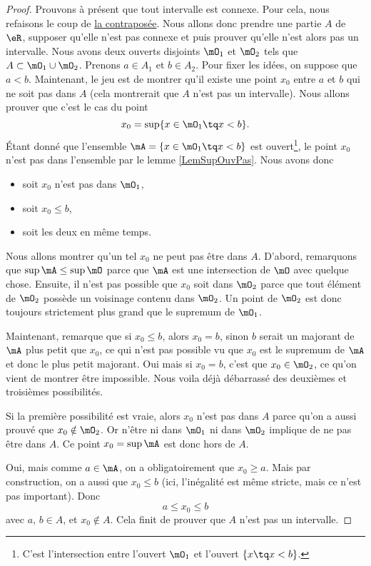 \begin{proof}
    Prouvons à présent que tout intervalle est connexe. Pour cela, nous refaisons le coup de \href{http://fr.wikipedia.org/wiki/Contraposée}{la contraposée}. Nous allons donc prendre une partie $A$ de $\eR$, supposer qu'elle n'est pas connexe et puis prouver qu'elle n'est alors pas un intervalle. Nous avons deux ouverts disjoints $\mO_1$ et $\mO_2$ tels que $A\subset \mO_1\cup \mO_2$. Prenons $a\in A_1$ et $b\in A_2$. Pour fixer les idées, on suppose que $a<b$. Maintenant, le jeu est de montrer qu'il existe une point $x_0$ entre $a$ et $b$ qui ne soit pas dans $A$ (cela montrerait que $A$ n'est pas un intervalle). Nous allons prouver que c'est le cas du point
    \[ 
      x_0=\sup\{ x\in\mO_1\tq x<b \}.
    \]
    Étant donné que l'ensemble $\mA=\{ x\in\mO_1\tq x<b \}$ est ouvert\footnote{C'est l'intersection entre l'ouvert $\mO_1$ et l'ouvert $\{x\tq x<b \}$.}, le point $x_0$ n'est pas dans l'ensemble par le lemme \ref{LemSupOuvPas}. Nous avons donc
    \begin{itemize}
        \item soit $x_0$ n'est pas dans $\mO_1$,
        \item soit $x_0\leq b$,
        \item soit les deux en même temps.
    \end{itemize}
    Nous allons montrer qu'un tel $x_0$ ne peut pas être dans $A$. D'abord, remarquons que $\sup\mA\leq\sup\mO$ parce que $\mA$ est une intersection de $\mO$ avec quelque chose. Ensuite, il n'est pas possible que $x_0$ soit dans $\mO_2$ parce que tout élément de $\mO_2$ possède un voisinage contenu dans $\mO_2$. Un point de $\mO_2$ est donc toujours strictement plus grand que le supremum de $\mO_1$.

    Maintenant, remarque que si $x_0\leq b$, alors $x_0=b$, sinon $b$ serait un majorant de $\mA$ plus petit que $x_0$, ce qui n'est pas possible vu que $x_0$ est le supremum de $\mA$ et donc le plus petit majorant. Oui mais si $x_0=b$, c'est que $x_0\in\mO_2$, ce qu'on vient de montrer être impossible. Nous voila déjà débarrassé des deuxièmes et troisièmes possibilités. 

    Si la première possibilité est vraie, alors $x_0$ n'est pas dans $A$ parce qu'on a aussi prouvé que $x_0\notin\mO_2$. Or n'être ni dans $\mO_1$ ni dans $\mO_2$ implique de ne pas être dans $A$. Ce point $x_0=\sup\mA$ est donc hors de $A$.

    Oui, mais comme $a\in\mA$, on a obligatoirement que $x_0\geq a$. Mais par construction, on a aussi que $x_0\leq b$ (ici, l'inégalité est même stricte, mais ce n'est pas important). Donc
    \[ 
      a\leq x_0\leq b
    \]
    avec $a$, $b\in A$, et $x_0\notin A$. Cela finit de prouver que $A$ n'est pas un intervalle.
\end{proof}

